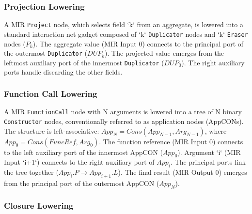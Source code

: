 \subsubsection{Projection Lowering}

A MIR \texttt{Project} node, which selects field `k` from an aggregate, is lowered into a standard interaction net gadget composed of `k` \texttt{Duplicator} nodes and `k` \texttt{Eraser} nodes ($P_k$). The aggregate value (MIR Input 0) connects to the principal port of the outermost \texttt{Duplicator} ($DUP_k$). The projected value emerges from the leftmost auxiliary port of the innermost \texttt{Duplicator} ($DUP_0$). The right auxiliary ports handle discarding the other fields.


\subsubsection{Function Call Lowering}

A MIR \texttt{FunctionCall} node with N arguments is lowered into a tree of N binary \texttt{Constructor} nodes, conventionally referred to as application nodes (AppCONs). The structure is left-associative: $App_N = Cons(App_{N-1}, Arg_{N-1})$, where $App_0 = Cons(FuncRef, Arg_0)$. The function reference (MIR Input 0) connects to the left auxiliary port of the innermost AppCON ($App_0$). Argument `i` (MIR Input `i+1`) connects to the right auxiliary port of $App_i$. The principal ports link the tree together ($App_i.P \to App_{i+1}.L$). The final result (MIR Output 0) emerges from the principal port of the outermost AppCON ($App_N$).


\subsubsection{Closure Lowering}

